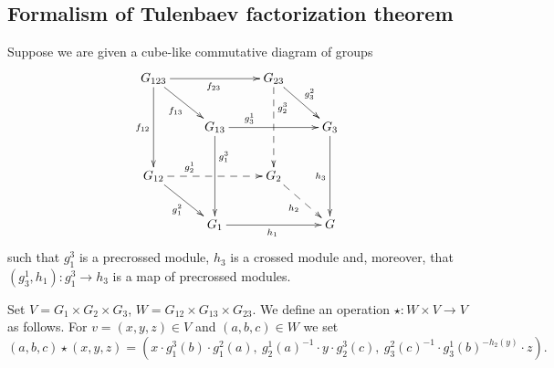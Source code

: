 \documentclass[oneside, 10pt]{amsart}
\numberwithin{equation}{section}
\numberwithin{lemma}{section}
\theoremstyle{definition}
\theoremstyle{remark}
\begin{document}
\subsection{Formalism of Tulenbaev factorization theorem}
Suppose we are given a cube-like commutative diagram of groups
\begin{equation} \label{eq:cube} \begin{split} \xymatrix{
G_{123} \ar[rr]_{f_{23}} \ar[dd]_{f_{12}} \ar[rd]_{f_{13}} &                        & G_{23} \ar@{-->}[dd]^(.3){g_2^3} \ar[rd]^{g^2_3} &           \\
                                & G_{13} \ar[rr]^(.3){g^1_3} \ar^(.3){g^3_1}[dd] &                   & G_3 \ar[dd]_{h_3} \\
G_{12} \ar@{-->}[rr]^(.3){g_2^1} \ar[rd]_{g_1^2}          &                        & G_2 \ar@{-->}[rd]_{h_2}         &           \\
                                & G_1 \ar[rr]_{h_1}              &                   & G} \end{split} \end{equation}
such that $g_1^3$ is a precrossed module, $h_3$ is a crossed module and, moreover, that $(g_3^1, h_1) \colon g_1^3 \to h_3$ is a map of precrossed modules.

Set $V = G_1 \times G_2 \times G_3$, $W = G_{12} \times G_{13} \times G_{23}$.
We define an operation $\star \colon W \times V \to V$ as follows. For $v = (x, y, z) \in V$ and $(a, b, c) \in W$ we set 
\[(a, b, c) \star (x, y, z) = (x \cdot g_1^3(b) \cdot g_1^2(a),\ g_2^1(a)^{-1} \cdot y \cdot g_2^3(c),\ g_3^2(c)^{-1} \cdot g_3^1(b)^{-h_2(y)} \cdot z).\]
\end{document}
